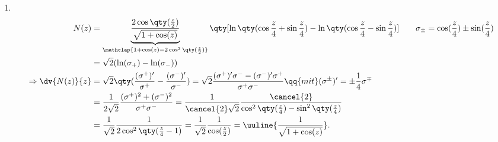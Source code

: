 \begin{enumerate}[label=(\alph*)]
    \item$~$\\[-1.5cm]
    \begin{align}
        N(z) &=\underbrace{\frac{2\cos\qty(\frac{z}{2})}{\sqrt{1+\cos(z)}}}_{\mathclap{1+\cos(z) = 2 \cos^2\qty(\frac{z}{2})}}\qty[\ln\qty(\cos\frac{z}{4}+\sin\frac{z}{4})-\ln\qty(\cos\frac{z}{4}-\sin\frac{z}{4})] \qquad \sigma_{\pm} = \cos(\frac{z}{4})\pm \sin(\frac{z}{4}) \\
        &= \sqrt{2}(\ln(\sigma_+)-\ln(\sigma_-)) \\
        \Rightarrow \dv{N(z)}{z} &= \sqrt{2} \qty(\frac{(\sigma^+)'}{\sigma^+} - \frac{(\sigma^-)'}{\sigma^-}) = \sqrt{2} \frac{(\sigma^+)' \sigma^- - (\sigma^-)'\sigma^+}{\sigma^+ \sigma^-} \qq{mit} (\sigma^\pm)' = \pm \frac{1}{4}\sigma^\mp \\
        &= \frac{1}{2\sqrt{2}} \frac{(\sigma^+)^2 + (\sigma^-)^2}{\sigma^+ \sigma^-} = \frac{1}{\cancel{2}\sqrt{2}} \frac{\cancel{2}}{\cos^2\qty(\frac{z}{4})-\sin^2\qty(\frac{z}{4})} \notag \\
        &= \frac{1}{\sqrt{2}} \frac{1}{2\cos^2\qty(\frac{z}{4}-1)} = \frac{1}{\sqrt{2}} \frac{1}{\cos(\frac{z}{2})} = \uuline{\frac{1}{\sqrt{1+\cos(z)}}}.  
    \end{align}
\end{enumerate}
%
